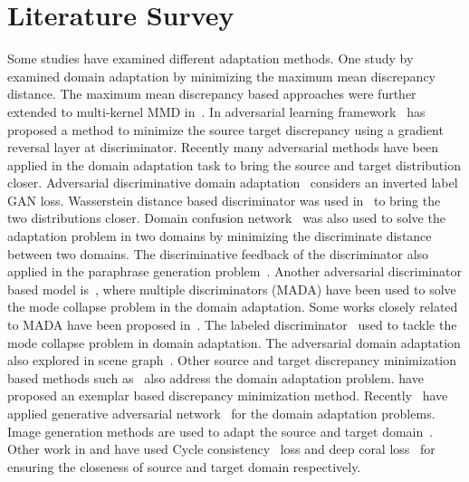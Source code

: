 \documentclass[10pt,twocolumn,letterpaper]{article}
\begin{document}
\section{Literature Survey}


Some studies have examined different adaptation methods. One study by~\cite{tzeng_arxiv2014} examined domain adaptation by minimizing the maximum mean discrepancy distance. The maximum mean discrepancy based approaches were further extended to multi-kernel MMD in~\cite{long_ICML2015}. In adversarial learning framework~\cite{ganin_ICML2015} has proposed a method to minimize the source target discrepancy using a gradient reversal layer at discriminator. Recently many adversarial methods have been applied in the domain adaptation task to bring the source and target distribution closer. Adversarial discriminative domain adaptation~\cite{tzeng_CVPR2017} considers an inverted label GAN loss. Wasserstein distance based discriminator was used in~\cite{shen_AAAI2018wasserstein} to bring the two distributions closer. Domain confusion network~\cite{tzeng_ICCV2015} was also used to solve the adaptation problem in two domains by minimizing the discriminate distance between two domains. The discriminative feedback of the discriminator also applied in the paraphrase generation problem~\cite{patro2018learning}. Another adversarial discriminator based model is~\cite{pei_arxiv2018}, where multiple discriminators (MADA) have been used to solve the mode collapse problem in the domain adaptation. Some works closely related to MADA have been proposed in~\cite{cao2018partial, Cao_2018_CVPR}. The labeled discriminator~\cite{kurmi1904.01341} used to tackle the mode collapse problem in domain adaptation. The adversarial domain adaptation also explored in scene graph~\cite{kumar2019adversarial}. Other source and target discrepancy minimization based methods such as~\cite{saito_cvpr2017maximum,zhang_cvpr2018aligning} also address the domain adaptation problem. \cite{patro2018multimodal,Patro_2018_CVPR} have proposed an exemplar based discrepancy minimization method. Recently~\cite{bousmalis_CVPR2017,choi2017_cvprstargan} have applied generative adversarial network~\cite{goodfellow_NIPS2014} for the domain adaptation problems. Image generation methods are used to adapt the source and target domain~\cite{ghifary_ICCV2015,sankaranarayanan_cvpr2018learning,murez_cvpr2018image}. Other work in\cite{hoffman2018cycada} and \cite{sun_ECCV2016} have used Cycle consistency~\cite{zhu_CVPR2017} loss and deep coral loss~\cite{sun_DACVA2017,sun_2016AAAI} for ensuring the closeness of source and target domain respectively.
\end{document}
